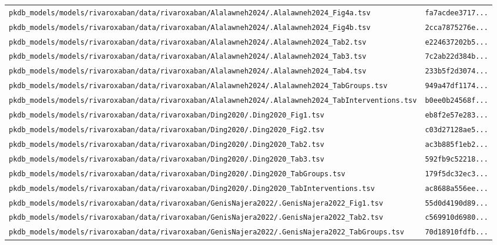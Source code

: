 \begin{longtable}{ll}
\texttt{pkdb\_models/models/rivaroxaban/data/rivaroxaban/Alalawneh2024/.Alalawneh2024\_Fig4a.tsv} & \texttt{fa7acdee3717...} \\
\texttt{pkdb\_models/models/rivaroxaban/data/rivaroxaban/Alalawneh2024/.Alalawneh2024\_Fig4b.tsv} & \texttt{2cca7875276e...} \\
\texttt{pkdb\_models/models/rivaroxaban/data/rivaroxaban/Alalawneh2024/.Alalawneh2024\_Tab2.tsv} & \texttt{e224637202b5...} \\
\texttt{pkdb\_models/models/rivaroxaban/data/rivaroxaban/Alalawneh2024/.Alalawneh2024\_Tab3.tsv} & \texttt{7c2ab22d384b...} \\
\texttt{pkdb\_models/models/rivaroxaban/data/rivaroxaban/Alalawneh2024/.Alalawneh2024\_Tab4.tsv} & \texttt{233b5f2d3074...} \\
\texttt{pkdb\_models/models/rivaroxaban/data/rivaroxaban/Alalawneh2024/.Alalawneh2024\_TabGroups.tsv} & \texttt{949a47df1174...} \\
\texttt{pkdb\_models/models/rivaroxaban/data/rivaroxaban/Alalawneh2024/.Alalawneh2024\_TabInterventions.tsv} & \texttt{b0ee0b24568f...} \\
\texttt{pkdb\_models/models/rivaroxaban/data/rivaroxaban/Ding2020/.Ding2020\_Fig1.tsv} & \texttt{eb8f2e57e283...} \\
\texttt{pkdb\_models/models/rivaroxaban/data/rivaroxaban/Ding2020/.Ding2020\_Fig2.tsv} & \texttt{c03d27128ae5...} \\
\texttt{pkdb\_models/models/rivaroxaban/data/rivaroxaban/Ding2020/.Ding2020\_Tab2.tsv} & \texttt{ac3b885f1eb2...} \\
\texttt{pkdb\_models/models/rivaroxaban/data/rivaroxaban/Ding2020/.Ding2020\_Tab3.tsv} & \texttt{592fb9c52218...} \\
\texttt{pkdb\_models/models/rivaroxaban/data/rivaroxaban/Ding2020/.Ding2020\_TabGroups.tsv} & \texttt{179f5dc32ec3...} \\
\texttt{pkdb\_models/models/rivaroxaban/data/rivaroxaban/Ding2020/.Ding2020\_TabInterventions.tsv} & \texttt{ac8688a556ee...} \\
\texttt{pkdb\_models/models/rivaroxaban/data/rivaroxaban/GenisNajera2022/.GenisNajera2022\_Fig1.tsv} & \texttt{55d0d4190d89...} \\
\texttt{pkdb\_models/models/rivaroxaban/data/rivaroxaban/GenisNajera2022/.GenisNajera2022\_Tab2.tsv} & \texttt{c569910d6980...} \\
\texttt{pkdb\_models/models/rivaroxaban/data/rivaroxaban/GenisNajera2022/.GenisNajera2022\_TabGroups.tsv} & \texttt{70d18910fdfb...} \\

\end{longtable}
